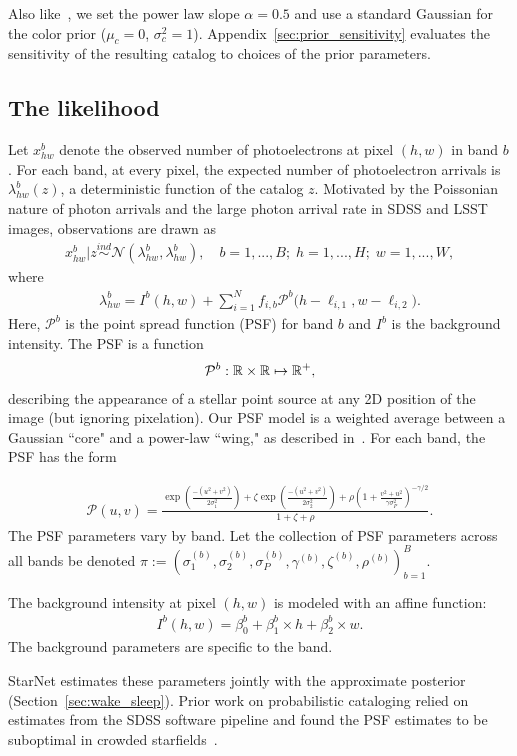 Also like~\cite{Feder_2019}, we set the power law slope $\alpha = 0.5$ and use a standard Gaussian for the color prior ($\mu_c = 0$, $\sigma^2_c = 1$). 
Appendix~\ref{sec:prior_sensitivity} evaluates the 
sensitivity of the resulting catalog to choices of the prior parameters. 

\subsection{The likelihood}
Let $x_{hw}^b$ denote the observed number of photoelectrons at pixel $(h,w)$ in band $b$. 
For each band, at every pixel, the expected number of photoelectron arrivals is $\lambda^b_{hw}(z)$, a deterministic function of the catalog $z$. Motivated by the Poissonian nature of photon arrivals and 
the large photon arrival rate in SDSS and LSST images, 
observations are drawn as
\begin{align}
  x_{hw}^b | z \overset{ind}{\sim} \mathcal{N}(\lambda^b_{hw}, \lambda^b_{hw}),
  \quad 
  b = 1, ..., B; \;
  h = 1,..., H; \; 
  w = 1, ..., W, 
\end{align}
where 
\begin{align}
  \lambda^b_{hw} = I^{b}(h, w) + \sum_{i = 1}^N f_{i,b} \mathcal{P}^b\big(h - \ell_{i, 1}, w - \ell_{i, 2}\big).
  \label{eq:expected_intensity}
\end{align}
Here, $\mathcal{P}^b$ is the point spread function (PSF) for band $b$ and $I^{b}$ is the background intensity. The PSF is a function 
\begin{align}
\mathcal{P}^b : \mathbb{R} \times \mathbb{R} \mapsto \mathbb{R}^+,
\end{align}
describing the appearance of a stellar point source at any 2D position of the image (but ignoring pixelation). 
Our PSF model is a weighted average between a Gaussian ``core" and a power-law ``wing," as described in~\cite{Xin2018psf}. For each band, the PSF has the form

\begin{align}
    \mathcal{P}(u,v) = 
    \frac{\exp(\frac{-(u^2 + v^2)}{2\sigma_1^2}) + 
    \zeta \exp(\frac{-(u^2 + v^2)}{2\sigma_2^2}) + 
    \rho(1 + \frac{v^2 + u^2}{\gamma\sigma^2_P})^{-\gamma/2} }{1 + \zeta + \rho}.
\end{align}
The PSF parameters vary by band. Let the collection of PSF parameters across all bands be denoted $\pi := (\sigma_{1}^{(b)}, \sigma_{2}^{(b)}, \sigma_{P}^{(b)}, \gamma^{(b)}, \zeta^{(b)}, \rho^{(b)})_{b=1}^B$.

The background intensity at pixel $(h,w)$ is modeled with an affine function: 
\begin{align}
    I^{b}(h,w) = \beta_0^{b} + \beta_1^{b} \times h + \beta_2^{b} \times w.
\end{align}
The background parameters are specific to the band. 

StarNet estimates these parameters jointly with the approximate posterior (Section~\ref{sec:wake_sleep}). 
Prior work on probabilistic cataloging relied 
on estimates from the SDSS software pipeline and found the PSF estimates to be suboptimal in crowded starfields~\citep{Feder_2019}. 


